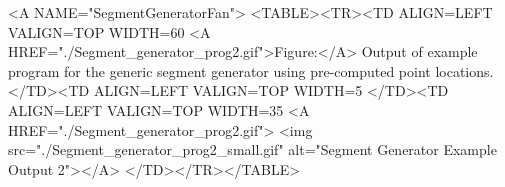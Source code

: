 
\begin{ccHtmlOnly}
  <A NAME="SegmentGeneratorFan">
  <TABLE><TR><TD ALIGN=LEFT VALIGN=TOP WIDTH=60%
    <A HREF="./Segment_generator_prog2.gif">Figure:</A>
    Output of example program for the generic segment generator using
    pre-computed point locations.
  </TD><TD ALIGN=LEFT VALIGN=TOP WIDTH=5%
  </TD><TD ALIGN=LEFT VALIGN=TOP WIDTH=35%
    <A HREF="./Segment_generator_prog2.gif">
        <img src="./Segment_generator_prog2_small.gif" 
             alt="Segment Generator Example Output 2"></A>
  </TD></TR></TABLE>
\end{ccHtmlOnly}


\ccParDims
\cgalColumnLayout




\ccParDims
\beforecprogskip\parskip
{}


